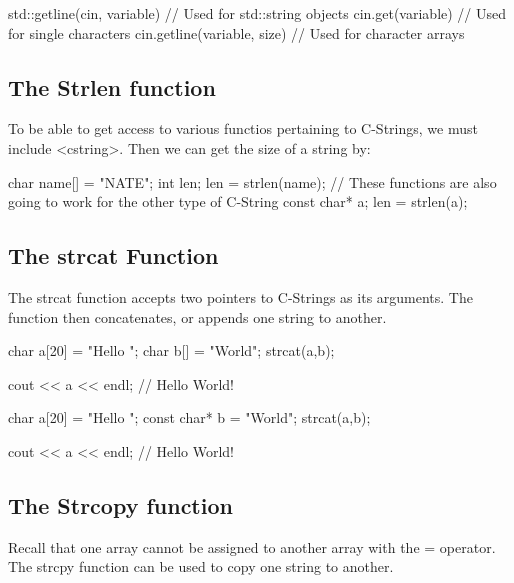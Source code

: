 \documentclass{report}
\begin{document}
    \begin{cppcode}
std::getline(cin, variable) // Used for std::string objects
cin.get(variable) // Used for single characters
cin.getline(variable, size) // Used for character arrays
    \end{cppcode}
    
    \bigbreak \noindent 

    \bigbreak \noindent 
    \subsection{The Strlen function}
    \bigbreak \noindent 
    To be able to get access to various functios pertaining to C-Strings, we must include <cstring>. Then we can get the size of a string by:
    \bigbreak \noindent 
    
    \begin{cppcode}
char name[] = "NATE";
int len;
len = strlen(name);
// These functions are also going to work for the other type of C-String
const char* a;
len = strlen(a);
    \end{cppcode}
    
    \bigbreak \noindent 


    \pagebreak
    \subsection{The strcat Function}
    \bigbreak \noindent 
    The strcat function accepts two pointers to C-Strings as its arguments. The function then concatenates, or appends one string to another.
    \bigbreak \noindent 
    
    \begin{cppcode}
char a[20] = "Hello ";
char b[] = "World";
strcat(a,b);

cout << a << endl; // Hello World!

char a[20] = "Hello ";
const char* b = "World";
strcat(a,b);

cout << a << endl; // Hello World!
    \end{cppcode}
    
    \bigbreak \noindent 
    
    \bigbreak \noindent 
    \subsection{The Strcopy function}
    \bigbreak \noindent 
    Recall that one array cannot be assigned to another array with the = operator. The strcpy function can be used to copy one string to another.
    \bigbreak \noindent 
    
\end{document}
